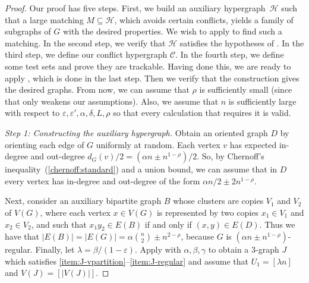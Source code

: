 \documentclass[a4paper, 11pt,reqno]{amsart}
\newcommand{\calC}{\mathcal{C}}
\theoremstyle{plain}
\theoremstyle{definition}
\numberwithin{equation}{section}
\newcommand{\eps}{\varepsilon}
\begin{document}
\begin{proof}%
Our proof has five steps.  First, we build an auxiliary
hypergraph~$\mathcal{H}$ such that a large matching $M \subseteq
\mathcal{H}$, which avoids certain conflicts, yields a
family of subgraphs of $G$ with the desired properties.  We wish to apply
 to find such a matching.  In the
second step, we verify that $\mathcal{H}$ satisfies the
hypotheses of . In the third step,
we define our conflict hypergraph $\calC$. In the fourth step, we
define some test sets and prove they are trackable. Having done
this, we are ready to apply , which
is done in the last step. Then we verify that the construction gives
the desired graphs.
From now, we can assume that $\rho$ is sufficiently small (since that only weakens our assumptions).
Also, we assume that $n$ is sufficiently large with respect to $\eps, \eps', \alpha, \delta, L, \rho$ so that every calculation that requires it is valid. \medskip

\noindent \emph{Step 1: Constructing the auxiliary hypergraph.}
Obtain an oriented graph $D$ by orienting each edge of $G$ uniformly
at random. Each vertex $v$ has expected in-degree and out-degree
$d_G(v)/2 = (\alpha n \pm n^{1 - \rho})/2$. So, by
Chernoff's inequality~(\ref{chernoff:standard}) and a union bound, we can assume that in $D$
every vertex has in-degree and out-degree of the form $\alpha n/2 \pm
2n^{1 - \rho}$.

Next, consider an auxiliary bipartite graph $B$ whose clusters are
copies $V_1$ and $V_2$ of $V(G)$, where each vertex $x \in V(G)$ is
represented by two copies $x_1 \in V_1$ and $x_2 \in V_2$,
and such that $x_1 y_2 \in E(B)$ if and only if $(x, y) \in E(D)$.
Thus we have that $|E(B)| = |E(G)| = \alpha \binom{n}{2} \pm n^{2 - \rho}$, 
because $G$ is $(\alpha n \pm n^{1 - \rho})$-regular. 
Finally, let $\lambda = \beta/(1 - \eps)$. %
Apply  with $\alpha,\beta,\gamma$ to obtain 
a $3$-graph $J$ which satisfies \ref{item:J-vpartition}--\ref{item:J-regular} 
and assume that $U_1 = [\lambda n]$ and $V(J) = [|V(J)|]$.


\end{proof}
\end{document}
